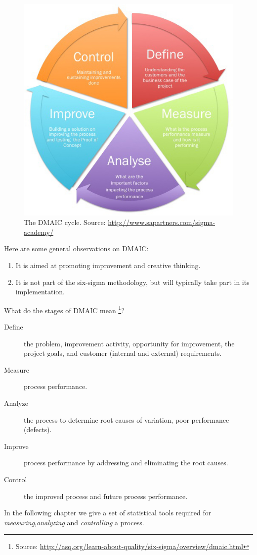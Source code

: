 \documentclass[12pt,a4paper]{report}
\begin{document}
\begin{figure}[t]
\centering
\includegraphics[width=0.6\linewidth]{art/Sigma_detail}
\caption[DMAIC]{The DMAIC cycle. Source: \url{http://www.sapartners.com/sigma-academy/}}
\label{fig:DMAIC}
\end{figure}

Here are some general observations on DMAIC:
\begin{enumerate}
\item It is aimed at promoting improvement and creative thinking.
\item It is not part of the six-sigma methodology, but will typically take part in its implementation.
\end{enumerate}

What do the stages of DMAIC mean \footnote{Source: \url{http://asq.org/learn-about-quality/six-sigma/overview/dmaic.html}}?
\begin{description}
\item [Define] the problem, improvement activity, opportunity for improvement, the project goals, and customer (internal and external) requirements.
\item [Measure] process performance.
\item [Analyze] the process to determine root causes of variation, poor performance (defects).
\item [Improve] process performance by addressing and eliminating the root causes.
\item [Control] the improved process and future process performance.
\end{description}

In the following chapter we give a set of statistical tools required for \emph{measuring},\emph{analyzing} and \emph{controlling} a process.
\end{document}
